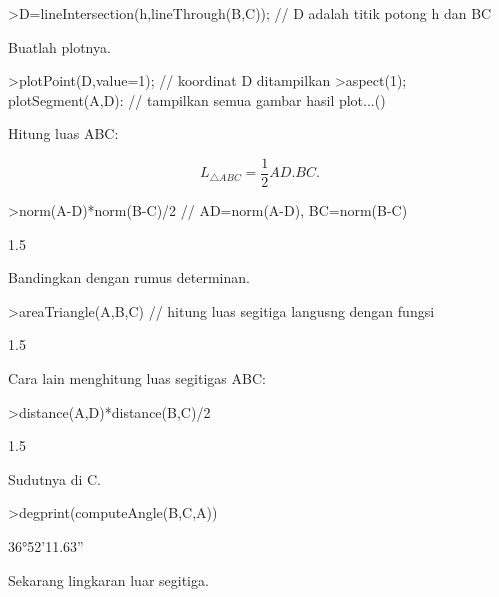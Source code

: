 \documentclass{article}
\begin{document}
\begin{eulernotebook}
\begin{eulercomment}
\begin{eulercomment}
\begin{eulerprompt}
>D=lineIntersection(h,lineThrough(B,C)); // D adalah titik potong h dan BC
\end{eulerprompt}
\begin{eulercomment}
Buatlah plotnya.
\end{eulercomment}
\begin{eulerprompt}
>plotPoint(D,value=1); // koordinat D ditampilkan
>aspect(1); plotSegment(A,D): // tampilkan semua gambar hasil plot...()
\end{eulerprompt}
\begin{eulercomment}
Hitung luas ABC:

\end{eulercomment}
\begin{eulerformula}
\[
L_{\triangle ABC}= \frac{1}{2}AD.BC.
\]
\end{eulerformula}
\begin{eulerprompt}
>norm(A-D)*norm(B-C)/2 // AD=norm(A-D), BC=norm(B-C)
\end{eulerprompt}
\begin{euleroutput}
  1.5
\end{euleroutput}
\begin{eulercomment}
Bandingkan dengan rumus determinan.
\end{eulercomment}
\begin{eulerprompt}
>areaTriangle(A,B,C) // hitung luas segitiga langusng dengan fungsi
\end{eulerprompt}
\begin{euleroutput}
  1.5
\end{euleroutput}
\begin{eulercomment}
Cara lain menghitung luas segitigas ABC:
\end{eulercomment}
\begin{eulerprompt}
>distance(A,D)*distance(B,C)/2
\end{eulerprompt}
\begin{euleroutput}
  1.5
\end{euleroutput}
\begin{eulercomment}
Sudutnya di C.
\end{eulercomment}
\begin{eulerprompt}
>degprint(computeAngle(B,C,A))
\end{eulerprompt}
\begin{euleroutput}
  36°52'11.63''
\end{euleroutput}
\begin{eulercomment}
Sekarang lingkaran luar segitiga.

\end{eulercomment}
\end{eulercomment}
\end{eulercomment}
\end{eulernotebook}
\end{document}
